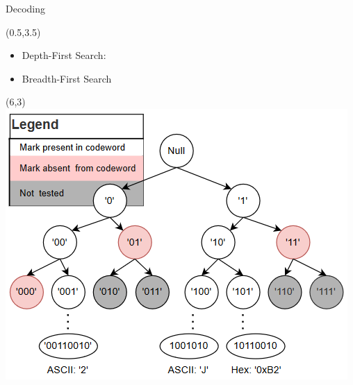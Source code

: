 \documentclass[xcolor=x11names,compress,handout]{beamer}
\begin{document}

\begin{frame}{Decoding}

	\begin{textblock}{5}(0.5,3.5)
		\begin{itemize}
			\item Depth-First Search:
			\item Breadth-First Search
		\end{itemize}
	\end{textblock}
	\begin{textblock}{10}(6,3)
		\includegraphics[scale=0.5]{./images/decoder_search_tree}
	\end{textblock}
\end{frame}

\end{document}
